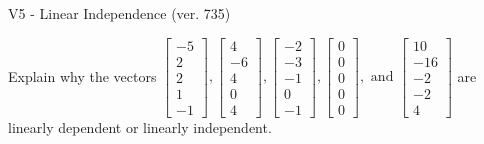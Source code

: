 \begin{exercise}
  \begin{exerciseTitle}V5 - Linear Independence (ver. 735)\end{exerciseTitle}
  \begin{exerciseStatement}
    Explain why the vectors \(\left[\begin{array}{r}
-5 \\
2 \\
2 \\
1 \\
-1
\end{array}\right] , \left[\begin{array}{r}
4 \\
-6 \\
4 \\
0 \\
4
\end{array}\right] , \left[\begin{array}{r}
-2 \\
-3 \\
-1 \\
0 \\
-1
\end{array}\right] , \left[\begin{array}{r}
0 \\
0 \\
0 \\
0 \\
0
\end{array}\right] , \text{ and } \left[\begin{array}{r}
10 \\
-16 \\
-2 \\
-2 \\
4
\end{array}\right]\) are linearly dependent or linearly independent.	



\end{exerciseStatement}
\end{exercise}
